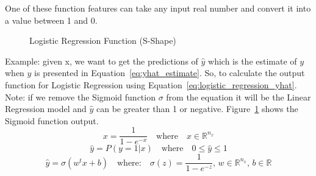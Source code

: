 One of these function features can take any input real number and convert it into a value between 1 and 0.%
\begin{figure}
\centering

\caption{Logistic Regression Function (S-Shape)}\label{Fig:Logistic}
\end{figure}%

Example: given x, we want to get the predictions of $\widehat{y}$ which is the estimate of $y$ when $\widehat{y}$ is presented in Equation~\eqref{eq:yhat_estimate}. So, to calculate the output function for Logistic Regression using Equation~\eqref{eq:logistic_regression_yhat}. Note: if we remove the Sigmoid function $\sigma$ from the equation it will be the Linear Regression model and $\widehat{y}$ can be greater than 1 or negative. Figure~\ref{Fig:Logistic} shows the Sigmoid function output.%
\begin{equation}\label{eq:logistic_function}
 x = \frac{1}{1-e^{-x}} \quad \text{where} \quad x \in \mathbb{R}^{n_x} 
\end{equation}
\begin{equation}
 \label{eq:yhat_estimate}
  \widehat{y} = P(y=1 | x) \quad \text{where} \quad 0 \le \widehat{y} \le 1
 \end{equation}
\begin{equation}
 \label{eq:logistic_regression_yhat}
 \widehat{y} = \sigma(w^t x + b) \quad \text{where:} \quad \sigma(z) = \frac{1}{1-e^{-z}} \text{, } w \in \mathbb{R}^{n_x} \text{, } b \in \mathbb{R} 
\end{equation}%
%
